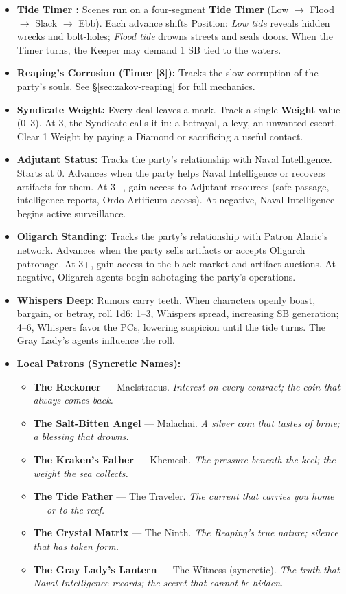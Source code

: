 \begin{itemize}
\item \textbf{Tide Timer :} Scenes run on a four-segment \textbf{Tide Timer } (Low $\rightarrow$ Flood $\rightarrow$ Slack $\rightarrow$ Ebb). Each advance shifts Position: \emph{Low tide} reveals hidden wrecks and bolt-holes; \emph{Flood tide} drowns streets and seals doors. When the Timer turns, the Keeper may demand 1 SB tied to the waters.
\item \textbf{Reaping's Corrosion (Timer [8]):} Tracks the slow corruption of the party's souls. See \S\ref{sec:zakov-reaping} for full mechanics.
\item \textbf{Syndicate Weight:} Every deal leaves a mark. Track a single \textbf{Weight} value (0--3). At 3, the Syndicate calls it in: a betrayal, a levy, an unwanted escort. Clear 1 Weight by paying a Diamond or sacrificing a useful contact.
\item \textbf{Adjutant Status:} Tracks the party's relationship with Naval Intelligence. Starts at 0. Advances when the party helps Naval Intelligence or recovers artifacts for them. At 3+, gain access to Adjutant resources (safe passage, intelligence reports, Ordo Artificum access). At negative, Naval Intelligence begins active surveillance.
\item \textbf{Oligarch Standing:} Tracks the party's relationship with Patron Alaric's network. Advances when the party sells artifacts or accepts Oligarch patronage. At 3+, gain access to the black market and artifact auctions. At negative, Oligarch agents begin sabotaging the party's operations.
\item \textbf{Whispers Deep:} Rumors carry teeth. When characters openly boast, bargain, or betray, roll 1d6: 1--3, Whispers spread, increasing SB generation; 4--6, Whispers favor the PCs, lowering suspicion until the tide turns. The Gray Lady's agents influence the roll.
\item \textbf{Local Patrons (Syncretic Names):}
  \begin{itemize}
    \item \textbf{The Reckoner} --- Maelstraeus. \textit{Interest on every contract; the coin that always comes back.}
    \item \textbf{The Salt-Bitten Angel} --- Malachai. \textit{A silver coin that tastes of brine; a blessing that drowns.}
    \item \textbf{The Kraken's Father} --- Khemesh. \textit{The pressure beneath the keel; the weight the sea collects.}
    \item \textbf{The Tide Father} --- The Traveler. \textit{The current that carries you home --- or to the reef.}
    \item \textbf{The Crystal Matrix} --- The Ninth. \textit{The Reaping's true nature; silence that has taken form.}
    \item \textbf{The Gray Lady's Lantern} --- The Witness (syncretic). \textit{The truth that Naval Intelligence records; the secret that cannot be hidden.}
  \end{itemize}
\end{itemize}

